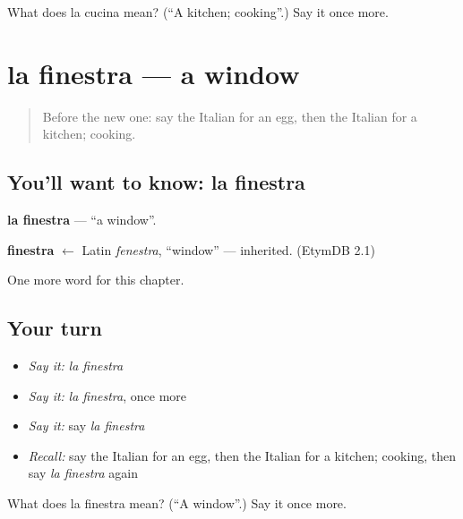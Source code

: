 \begin{tcolorbox}[breakable,colback=teal!4,colframe=teal!35!black,title={Before you move on}]
What does la cucina mean? (\textquotedblleft{}A kitchen; cooking\textquotedblright{}.) Say it once more.
\end{tcolorbox}
\section[la finestra]{la finestra — a window}

\label{lesson:IT-C56-finestra}



\begin{quote}
Before the new one: say the Italian for an egg, then the Italian for a kitchen; cooking.
\end{quote}

\subsection*{You'll want to know: la finestra}
\textbf{la finestra} — \textquotedblleft{}a window\textquotedblright{}.

\begin{cousinweb}
\textbf{finestra} $\leftarrow$ Latin \emph{fenestra}, \textquotedblleft{}window\textquotedblright{} — inherited. (EtymDB 2.1)
\end{cousinweb}

\begin{grammarlens}[title={What you've built}]
One more word for this chapter.
\end{grammarlens}

\subsection*{Your turn}
\begin{itemize}
\raggedright
  \item \emph{Say it:} \emph{la finestra}
  \item \emph{Say it:} \emph{la finestra}, once more
  \item \emph{Say it:} say \emph{la finestra}
  \item \emph{Recall:} say the Italian for an egg, then the Italian for a kitchen; cooking, then say \emph{la finestra} again
\end{itemize}

\begin{tcolorbox}[breakable,colback=teal!4,colframe=teal!35!black,title={Before you move on}]
What does la finestra mean? (\textquotedblleft{}A window\textquotedblright{}.) Say it once more.
\end{tcolorbox}
